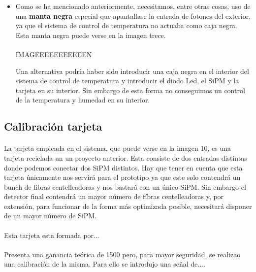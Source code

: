 \documentclass[11pt, a4paper]{article}
\begin{document}
\begin{itemize}
\item {} Como se ha mencionado anteriormente, necesitamos, entre otras cosas, uso de una \textbf{manta negra} especial que apantallase la entrada de fotones del exterior, ya que el sistema de control de temperatura no actuaba  como caja negra. Esta manta negra puede verse en la imagen trece.

\paragraph {}
IMAGEEEEEEEEEEEN


Una alternativa podría haber sido introducir una caja negra en el interior del sistema de control de temperatura y introducir el diodo Led, el SiPM y la tarjeta en su interior. Sin embargo de esta forma no conseguimos un control de la temperatura y humedad en su interior.

\end{itemize}



\newpage

\subsection {Calibración tarjeta}
\paragraph {}
La tarjeta empleada en el sistema, que puede verse en la imagen 10, es una tarjeta reciclada un un proyecto anterior. Esta consiste de dos entradas distintas donde podemos conectar dos SiPM distintos. Hay que tener en cuenta que esta tarjeta únicamente nos servirá para el prototipo ya que este solo contendrá un bunch de fibras centelleadoras y nos bastará con un único SiPM. Sin embargo el detector final contendrá un mayor número de fíbras centelleadoras y, por extensión, para funcionar de la forma más optimizada posible, necesitará disponer de un mayor número de SiPM.

\paragraph {}
Esta tarjeta esta formada por...%

\paragraph {}
Presenta una ganancia teórica de 1500 pero, para mayor seguridad, se realizao una calibración de la misma. Para ello se introdujo una señal de....	
\end{document}
